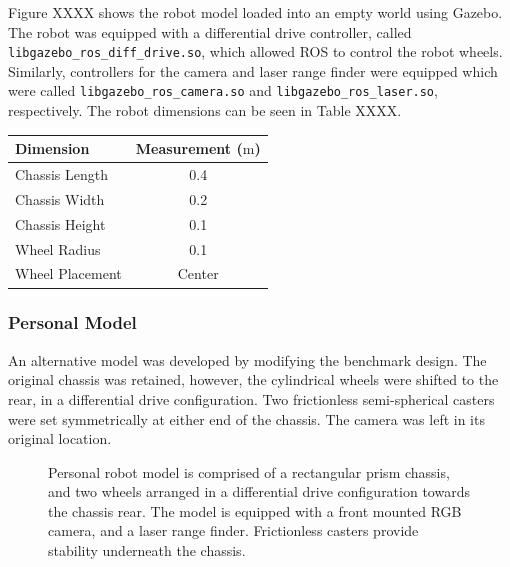 \documentclass[a4paper]{article}
\begin{document}
\begin{minipage}{0.45\textwidth}
Figure XXXX shows the robot model loaded into an empty world using Gazebo. The robot was equipped with a differential drive controller, called \texttt{libgazebo\_ros\_diff\_drive.so}, which allowed ROS to control the robot wheels. Similarly, controllers for the camera and laser range finder were equipped which were called \texttt{libgazebo\_ros\_camera.so} and \texttt{libgazebo\_ros\_laser.so}, respectively. The robot dimensions can be seen in Table XXXX.
\end{minipage}
\hspace{1cm}
\begin{minipage}{0.45\textwidth}
\centering
{}
\begin{tabular}{lc}
\toprule
\textbf{Dimension} & \textbf{Measurement ($\si{\meter}$)} \\
\midrule
Chassis Length & 0.4\\
Chassis Width & 0.2\\
Chassis Height & 0.1\\
Wheel Radius & 0.1\\
Wheel Placement & Center\\
\bottomrule
\end{tabular}
\end{minipage}


\subsubsection{Personal Model}
An alternative model was developed by modifying the benchmark design. The original chassis was retained, however, the cylindrical wheels were shifted to the rear, in a differential drive configuration. Two frictionless semi-spherical casters were set symmetrically at either end of the chassis. The camera was left in its original location.
\begin{figure}[h]
\centering
{}
\caption{Personal robot model is comprised of a rectangular prism chassis, and two wheels arranged in a differential drive configuration towards the chassis rear. The model is equipped with a front mounted RGB camera, and a laser range finder. Frictionless casters provide stability underneath the chassis.}
\end{figure}
\end{document}
